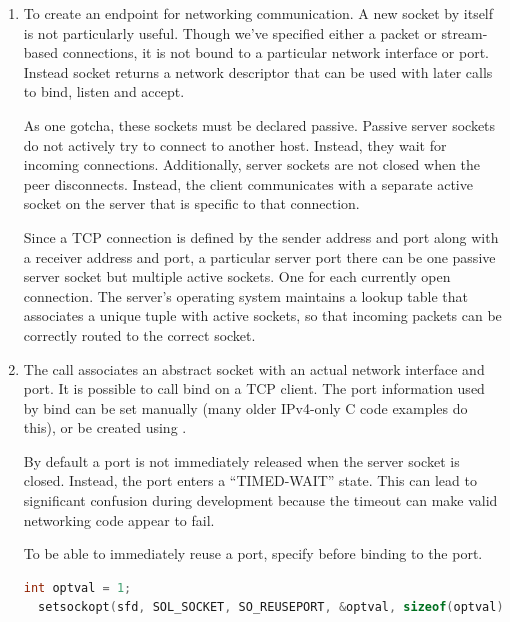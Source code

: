 \begin{enumerate}

  \item {}

  To create an endpoint for networking communication.
  A new socket by itself is not particularly useful.
  Though we've specified either a packet or stream-based connections, it is not bound to a particular network interface or port.
  Instead socket returns a network descriptor that can be used with later calls to bind, listen and accept.

  As one gotcha, these sockets must be declared passive.
  Passive server sockets do not actively try to connect to another host.
  Instead, they wait for incoming connections.
  Additionally, server sockets are not closed when the peer disconnects.
  Instead, the client communicates with a separate active socket on the server that is specific to that connection.

  Since a TCP connection is defined by the sender address and port along with a receiver address and port, a particular server port there can be one passive server socket but multiple active sockets.
  One for each currently open connection.
  The server's operating system maintains a lookup table that associates a unique tuple with active sockets, so that incoming packets can be correctly routed to the correct socket.

  \item {}

  The  call associates an abstract socket with an actual network interface and port.
  It is possible to call bind on a TCP client.
  The port information used by bind can be set manually (many older IPv4-only C code examples do this), or be created using .

  By default a port is not immediately released when the server socket is closed.
  Instead, the port enters a ``TIMED-WAIT'' state.
  This can lead to significant confusion during development because the timeout can make valid networking code appear to fail.

  To be able to immediately reuse a port, specify  before binding to the port.

  \begin{lstlisting}[language=C]
  int optval = 1;
  setsockopt(sfd, SOL_SOCKET, SO_REUSEPORT, &optval, sizeof(optval));


\end{lstlisting}
\end{enumerate}
